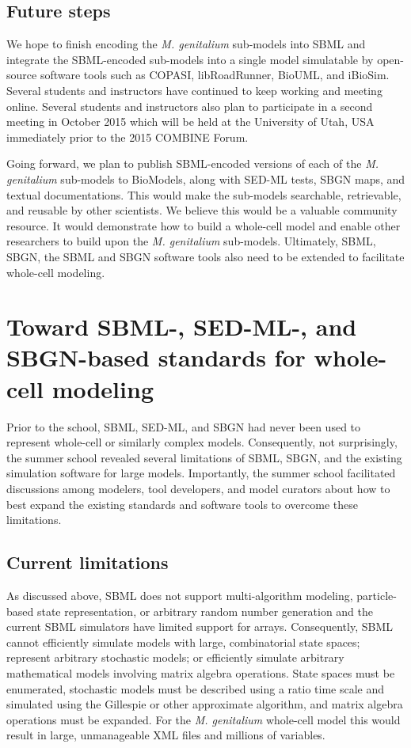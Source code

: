 \documentclass[journal,transmag]{IEEEtran}
\begin{document}
\subsection{Future steps}
We hope to finish encoding the \textit{M. genitalium} sub-models into SBML and integrate the SBML-encoded sub-models into a single model simulatable by open-source software tools such as COPASI, libRoadRunner, BioUML, and iBioSim. Several students and instructors have continued to keep working and meeting online. Several students and instructors also plan to participate in a second meeting in October 2015 which will be held at the University of Utah, USA immediately prior to the 2015 COMBINE Forum.

Going forward, we plan to publish SBML-encoded versions of each of the \textit{M. genitalium} sub-models to BioModels, along with SED-ML tests, SBGN maps, and textual documentations. This would make the sub-models searchable, retrievable, and reusable by other scientists. We believe this would be a valuable community resource. It would demonstrate how to build a whole-cell model and enable other researchers to build upon the \textit{M. genitalium} sub-models. Ultimately, SBML, SBGN, the SBML and SBGN software tools also need to be extended to facilitate whole-cell modeling.


\section{Toward SBML-, SED-ML-, and SBGN-based standards for whole-cell modeling}
Prior to the school, SBML, SED-ML, and SBGN had never been used to represent whole-cell or similarly complex models. Consequently, not surprisingly, the summer school revealed several limitations of SBML, SBGN, and the existing simulation software for large models. Importantly, the summer school facilitated discussions among modelers, tool developers, and model curators about how to best expand the existing standards and software tools to overcome these limitations.

\subsection{Current limitations}
As discussed above, SBML does not support multi-algorithm modeling, particle-based state representation, or arbitrary random number generation and the current SBML simulators have limited support for arrays. Consequently, SBML cannot efficiently simulate models with large, combinatorial state spaces; represent arbitrary stochastic models; or efficiently simulate arbitrary mathematical models involving matrix algebra operations. State spaces must be enumerated, stochastic models must be described using a ratio time scale and simulated using the Gillespie or other approximate algorithm, and matrix algebra operations must be expanded. For the \textit{M. genitalium} whole-cell model this would result in large, unmanageable XML files and millions of variables.
\end{document}
